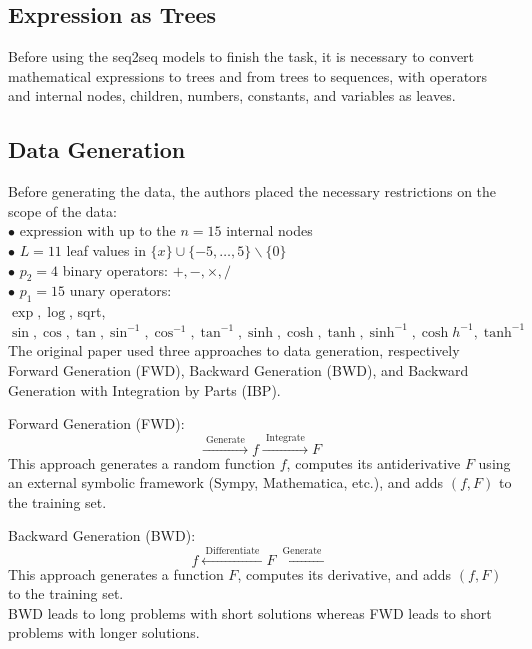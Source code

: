 \documentclass{article} %
\begin{document}
\subsection{Expression as Trees}
Before using the seq2seq models to finish the task, it is necessary to convert mathematical expressions to trees and from trees to sequences, with operators and internal nodes, children, numbers, constants, and variables as leaves. %

\subsection{Data Generation}
Before generating the data, the authors placed the necessary restrictions on the scope of the data:\\
$\bullet$ \quad expression with up to the $n=15$ internal nodes\\
$\bullet$ \quad $L=11$ leaf values in $\{x\}\cup\{-5, \ldots, 5\} \backslash\{0\}$\\
$\bullet$ \quad $p_{2}=4$ binary operators: $+,-,\times,/$\\
$\bullet$ \quad $p_{1}=15$ unary operators:\\
$\exp, \log$, sqrt, $\sin, \cos, \tan, \sin ^{-1}, \cos ^{-1}, \tan ^{-1}, \sinh , \cosh , \tanh , \sinh ^{-1}, \cosh h^{-1}, \tanh ^{-1}$\\
The original paper used three approaches to data generation, respectively Forward Generation (FWD), Backward Generation (BWD), and Backward Generation with Integration by Parts (IBP).

Forward Generation (FWD):
$$\stackrel{\text { Generate }}{\longrightarrow} f \stackrel{\text { Integrate }}{\longrightarrow} F$$
This approach generates a random function $f$, computes its antiderivative $F$ using an external symbolic framework (Sympy, Mathematica, etc.), and adds $(f,F)$ to the training set.

Backward Generation (BWD):
$$f \stackrel{\text { Differentiate }}{\longleftarrow} F \stackrel{\text { Generate }}{\longleftarrow}$$
This approach generates a function $F$, computes its derivative, and adds $(f,F)$ to the training set.\\
BWD leads to long problems with short solutions whereas FWD leads to short problems with longer solutions.
\end{document}
